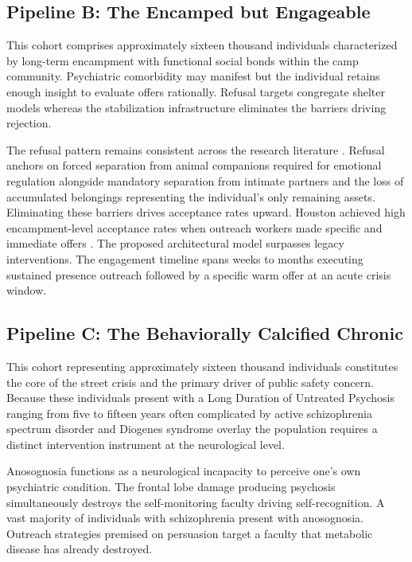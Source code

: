 \documentclass[12pt, letterpaper]{article}
\begin{document}
\subsection{Pipeline B: The Encamped but Engageable}

This cohort comprises approximately sixteen thousand individuals characterized by long-term encampment with functional social bonds within the camp community. Psychiatric comorbidity may manifest but the individual retains enough insight to evaluate offers rationally. Refusal targets congregate shelter models whereas the stabilization infrastructure eliminates the barriers driving rejection.

The refusal pattern remains consistent across the research literature \citep{usda_pet_barriers_2023, hud_shelter_barriers_2022}. Refusal anchors on forced separation from animal companions required for emotional regulation alongside mandatory separation from intimate partners and the loss of accumulated belongings representing the individual's only remaining assets. Eliminating these barriers drives acceptance rates upward. Houston achieved high encampment-level acceptance rates when outreach workers made specific and immediate offers \citep{houston_way_home_2024}. The proposed architectural model surpasses legacy interventions. The engagement timeline spans weeks to months executing sustained presence outreach followed by a specific warm offer at an acute crisis window.

\subsection{Pipeline C: The Behaviorally Calcified Chronic}

This cohort representing approximately sixteen thousand individuals constitutes the core of the street crisis and the primary driver of public safety concern. Because these individuals present with a Long Duration of Untreated Psychosis ranging from five to fifteen years often complicated by active schizophrenia spectrum disorder and Diogenes syndrome overlay the population requires a distinct intervention instrument at the neurological level.

Anosognosia functions as a neurological incapacity to perceive one's own psychiatric condition. The frontal lobe damage producing psychosis simultaneously destroys the self-monitoring faculty driving self-recognition. A vast majority of individuals with schizophrenia present with anosognosia. Outreach strategies premised on persuasion target a faculty that metabolic disease has already destroyed.
\end{document}
